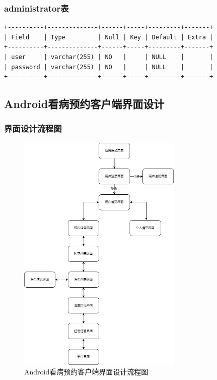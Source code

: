 \documentclass[UTF8,12pt]{article}
\begin{document}
\subsubsection{administrator表}
\begin{lstlisting}[frame=shadowbox]
+----------+--------------+------+-----+---------+-------+
| Field    | Type         | Null | Key | Default | Extra |
+----------+--------------+------+-----+---------+-------+
| user     | varchar(255) | NO   |     | NULL    |       |
| password | varchar(255) | NO   |     | NULL    |       |
+----------+--------------+------+-----+---------+-------+
\end{lstlisting}

\newpage

\subsection{Android看病预约客户端界面设计}
\subsubsection{界面设计流程图}
\begin{figure}[htbp]
    \centering
    \includegraphics[width=0.7\textwidth]{imgs/3.png}
    \caption{Android看病预约客户端界面设计流程图}
\end{figure}
\end{document}

